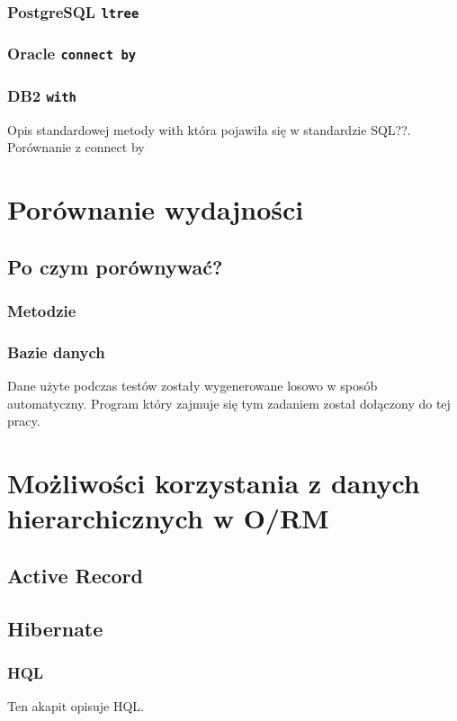\documentclass[12pt,a4paper,intlimits,oneside]{report}
\begin{document}
\subsection{PostgreSQL \texttt{ltree}}
\subsection{Oracle \texttt{connect by}}
\subsection{DB2 \texttt{with}}
Opis standardowej metody with która pojawiła się w standardzie SQL??. Porównanie z connect by

\chapter{Porównanie wydajności}
\section{Po czym porównywać?}
\subsection{Metodzie}
\subsection{Bazie danych}



Dane użyte podczas testów zostały wygenerowane losowo w sposób automatyczny. Program który zajmuje się tym zadaniem został dołączony do tej pracy.

\chapter{Możliwości korzystania z danych hierarchicznych w O/RM}
\section{Active Record}
\section{Hibernate}
\subsection{HQL}

Ten akapit opisuje HQL.
\end{document}

